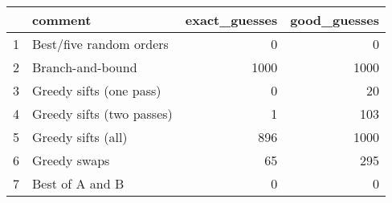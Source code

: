 \begin{table}[ht]
\centering
\begin{tabular}{rlrr}
  \hline
 & comment & exact\_guesses & good\_guesses \\ 
  \hline
1 & Best/five random orders &   0 &   0 \\ 
  2 & Branch-and-bound & 1000 & 1000 \\ 
  3 & Greedy sifts (one pass) &   0 &  20 \\ 
  4 & Greedy sifts (two passes) &   1 & 103 \\ 
  5 & Greedy sifts (all) & 896 & 1000 \\ 
  6 & Greedy swaps &  65 & 295 \\ 
  7 & Best of A and B &   0 &   0 \\ 
   \hline
\end{tabular}
\end{table}
